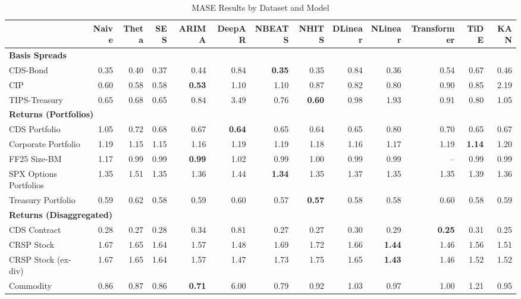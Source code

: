 
\begin{table}[htbp]
\centering
\caption{MASE Results by Dataset and Model}
\label{tab:mase_results}
\scriptsize
\setlength{\tabcolsep}{1.5pt}
\renewcommand{\arraystretch}{0.9}
\begin{tabular}{@{}lrrrrrrrrrrrr@{}}
\toprule
 & Naive & Theta & SES & ARIMA & DeepAR & NBEATS & NHITS & DLinear & NLinear & Transformer & TiDE & KAN \\
\midrule
\multicolumn{13}{l}{\textbf{Basis Spreads}} \\
CDS-Bond & 0.35 & 0.40 & 0.37 & 0.44 & 0.84 & \textbf{0.35} & 0.35 & 0.84 & 0.36 & 0.54 & 0.67 & 0.46 \\
CIP & 0.60 & 0.58 & 0.58 & \textbf{0.53} & 1.10 & 1.10 & 0.87 & 0.82 & 0.80 & 0.90 & 0.85 & 2.19 \\
TIPS-Treasury & 0.65 & 0.68 & 0.65 & 0.84 & 3.49 & 0.76 & \textbf{0.60} & 0.98 & 1.93 & 0.91 & 0.80 & 1.05 \\
\midrule
\multicolumn{13}{l}{\textbf{Returns (Portfolios)}} \\
CDS Portfolio & 1.05 & 0.72 & 0.68 & 0.67 & \textbf{0.64} & 0.65 & 0.64 & 0.65 & 0.80 & 0.70 & 0.65 & 0.67 \\
Corporate Portfolio & 1.19 & 1.15 & 1.15 & 1.16 & 1.19 & 1.19 & 1.18 & 1.16 & 1.17 & 1.19 & \textbf{1.14} & 1.20 \\
FF25 Size-BM & 1.17 & 0.99 & 0.99 & \textbf{0.99} & 1.02 & 0.99 & 1.00 & 0.99 & 0.99 & -- & 0.99 & 0.99 \\
SPX Options Portfolios & 1.35 & 1.51 & 1.35 & 1.36 & 1.44 & \textbf{1.34} & 1.35 & 1.37 & 1.35 & 1.35 & 1.39 & 1.36 \\
Treasury Portfolio & 0.59 & 0.62 & 0.58 & 0.59 & 0.60 & 0.57 & \textbf{0.57} & 0.58 & 0.58 & 0.60 & 0.58 & 0.59 \\
\midrule
\multicolumn{13}{l}{\textbf{Returns (Disaggregated)}} \\
CDS Contract & 0.28 & 0.27 & 0.28 & 0.34 & 0.81 & 0.27 & 0.27 & 0.30 & 0.29 & \textbf{0.25} & 0.31 & 0.25 \\
CRSP Stock & 1.67 & 1.65 & 1.64 & 1.57 & 1.48 & 1.69 & 1.72 & 1.66 & \textbf{1.44} & 1.46 & 1.56 & 1.51 \\
CRSP Stock (ex-div) & 1.67 & 1.65 & 1.64 & 1.57 & 1.47 & 1.73 & 1.75 & 1.65 & \textbf{1.43} & 1.46 & 1.52 & 1.52 \\
Commodity & 0.86 & 0.87 & 0.86 & \textbf{0.71} & 6.00 & 0.79 & 0.92 & 1.03 & 0.97 & 1.00 & 1.21 & 0.95 \\

\end{tabular}
\end{table}
